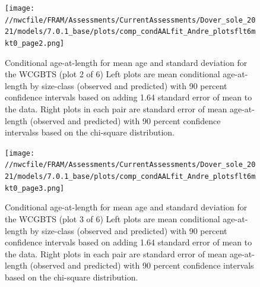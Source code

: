 \documentclass[11pt,
  english,
  a4paper,
]{article}
\begin{document}
\tagmcend\tagstructend


\begin{figure}
\centering
\texttt{[image: //nwcfile/FRAM/Assessments/CurrentAssessments/Dover\_sole\_2021/models/7.0.1\_base/plots/comp\_condAALfit\_Andre\_plotsflt6mkt0\_page2.png]}
\caption{Conditional age-at-length for mean age and standard deviation for the WCGBTS (plot 2 of 6) Left plots are mean conditional age-at-length by size-class (observed and predicted) with 90 percent confidence intervals based on adding 1.64 standard error of mean to the data. Right plots in each pair are standard error of mean age-at-length (observed and predicted) with 90 percent confidence intervalss based on the chi-square distribution.\label{fig:wcgbt-caal-fit-2}}
\end{figure}

\tagmcend\tagstructend


\begin{figure}
\centering
\texttt{[image: //nwcfile/FRAM/Assessments/CurrentAssessments/Dover\_sole\_2021/models/7.0.1\_base/plots/comp\_condAALfit\_Andre\_plotsflt6mkt0\_page3.png]}
\caption{Conditional age-at-length for mean age and standard deviation for the WCGBTS (plot 3 of 6) Left plots are mean conditional age-at-length by size-class (observed and predicted) with 90 percent confidence intervals based on adding 1.64 standard error of mean to the data. Right plots in each pair are standard error of mean age-at-length (observed and predicted) with 90 percent confidence intervals based on the chi-square distribution.\label{fig:wcgbt-caal-fit-3}}
\end{figure}
\end{document}
